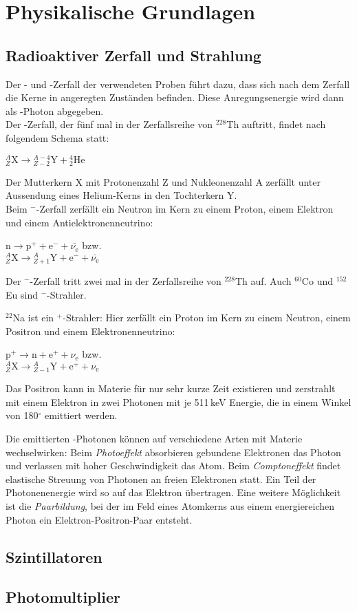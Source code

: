 \section{Physikalische Grundlagen}
\subsection{Radioaktiver Zerfall und Strahlung}

Der \textalpha- und \textbeta-Zerfall der verwendeten Proben führt dazu,
dass sich nach dem Zerfall die Kerne in angeregten Zuständen befinden.
Diese Anregungsenergie wird dann als \textgamma-Photon abgegeben.\\[\baselineskip]
Der \textalpha-Zerfall, der fünf mal in der Zerfallsreihe von ${}^{228}$Th auftritt,
findet nach folgendem Schema statt:
\begin{center}
${}^{A}_{Z}\text{X} \rightarrow {}^{A-4}_{Z-2}\text{Y} + {}^{4}_{2}\text{He}$
\end{center}
Der Mutterkern X mit Protonenzahl Z und Nukleonenzahl A zerfällt unter Aussendung eines Helium-Kerns
in den Tochterkern Y.\\[\baselineskip]
Beim \textbeta$^-$-Zerfall zerfällt ein Neutron im Kern zu einem Proton, einem Elektron und einem
Antielektronenneutrino:
\begin{center}
$\text{n} \rightarrow \text{p}^+ + \text{e}^- +\bar{\nu_{\text{e}}}$ bzw.\\[0.15cm]
${}^{A}_{Z}\text{X} \rightarrow {}^{A}_{Z+1}\text{Y} + \text{e}^- + \bar{\nu_{\text{e}}}$
\end{center}

Der \textbeta$^-$-Zerfall tritt zwei mal in der Zerfallsreihe von ${}^{228}$Th auf.
Auch ${}^{60}$Co und ${}^{152}$Eu sind \textbeta$^-$-Strahler.

${}^{22}$Na ist ein \textbeta$^+$-Strahler:
Hier zerfällt ein Proton im Kern zu einem Neutron, einem Positron und einem
Elektronenneutrino:
\begin{center}
$\text{p}^+ \rightarrow \text{n} + \text{e}^+ +\nu_{\text{e}}$ bzw.\\[0.15cm]
${}^{A}_{Z}\text{X} \rightarrow {}^{A}_{Z-1}\text{Y} + \text{e}^+ + \nu_{\text{e}}$
\end{center}

Das Positron kann in Materie für nur sehr kurze Zeit existieren und zerstrahlt mit einem Elektron
in zwei Photonen mit je 511\,keV Energie, die in einem Winkel von 180$^\circ$ emittiert werden.

Die emittierten \textgamma-Photonen können auf verschiedene Arten mit Materie wechselwirken:
Beim \emph{Photoeffekt} absorbieren gebundene Elektronen das Photon und verlassen mit hoher Geschwindigkeit das Atom.
Beim \emph{Comptoneffekt} findet elastische Streuung von Photonen an freien Elektronen statt.
Ein Teil der Photonenenergie wird so auf das Elektron übertragen.
Eine weitere Möglichkeit ist die \emph{Paarbildung}, bei der im Feld eines Atomkerns aus einem energiereichen
Photon ein Elektron-Positron-Paar entsteht.



\subsection{Szintillatoren}




\subsection{Photomultiplier}